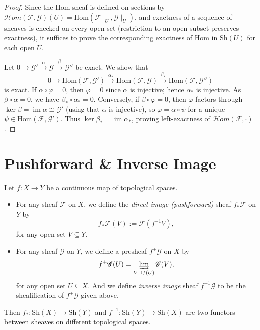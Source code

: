 \documentclass[11pt]{article}
\begin{document}
\begin{proof}
  Since the Hom sheaf is defined on sections by
  $\mathscr{H}{om}(\mathscr{F},\mathscr{G})(U)=\mathrm{Hom}(\mathscr{F}\mid_U,\mathscr{G}\mid_U)$,
  and exactness of a sequence of sheaves is checked on every open set (restriction to an open subset preserves exactness), it suffices to prove the corresponding exactness of $\mathrm{Hom}$ in $\mathrm{Sh}(U)$ for each open $U$.

  Let $0\to\mathscr{G}'\xrightarrow{\alpha}\mathscr{G}\xrightarrow{\beta}\mathscr{G}''$ be exact. We show that
  \[
    0\to\mathrm{Hom}(\mathscr{F},\mathscr{G}')\xrightarrow{\alpha_*}\mathrm{Hom}(\mathscr{F},\mathscr{G})\xrightarrow{\beta_*}\mathrm{Hom}(\mathscr{F},\mathscr{G}'')
  \]
  is exact. If $\alpha\circ\varphi=0$, then $\varphi=0$ since $\alpha$ is injective; hence $\alpha_*$ is injective. As $\beta\circ\alpha=0$, we have $\beta_*\circ\alpha_*=0$. Conversely, if $\beta\circ\varphi=0$, then $\varphi$ factors through $\ker\beta=\operatorname{im}\alpha\cong\mathscr{G}'$ (using that $\alpha$ is injective), so $\varphi=\alpha\circ\psi$ for a unique $\psi\in\mathrm{Hom}(\mathscr{F},\mathscr{G}')$. Thus $\ker\beta_*=\operatorname{im}\alpha_*$, proving left-exactness of $\mathscr{H}{om}(\mathscr{F},\cdot)$.
\end{proof}


\section{Pushforward \& Inverse Image}

\begin{definition}
  Let $f: X \to Y$ be a continuous map of topological spaces.
  \begin{itemize}
    \item For any sheaf $ \mathscr{F} $ on $ X $, we define the \emph{direct image (pushforward)} 
    sheaf $ f_{*}\mathscr{F} $ on $ Y $ by $$ f_{*}\mathscr{F}(V):=\mathscr{F}(f^{-1}V),$$ 
    for any open set $ V \subseteq Y $. 
    \item For any sheaf $ \mathscr{G} $ on $ Y $, we define a  
    presheaf 
    $ f^{+}\mathscr{G} $ on $ X $ by $$ f^{+}\mathscr{G}(U)=
    \varinjlim_{V \supseteq f(U)} \mathscr{G}(V),$$ 
    for any open set $ U \subseteq X $. And we define \emph{inverse image} 
    sheaf $ f^{-1}\mathscr{G} $ to be the sheafification of $ f^{+}\mathscr{G} $ given above.  
  \end{itemize}

  Then $f_{*}:\mathrm{Sh}(X) \to \mathrm{Sh}(Y)$ and $f^{-1}:\mathrm{Sh}(Y) \to \mathrm{Sh}(X)$ 
  are two functors between sheaves on different topological spaces. 
\end{definition}
\end{document}
